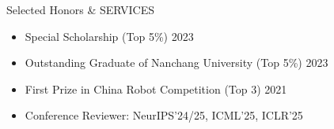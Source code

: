 \documentclass{resume} %
\begin{document}
\vspace{-0.5mm}
\begin{rSection}{Selected  Honors \& SERVICES}
\vspace{-1mm}
\begin{itemize}[leftmargin=1.5em]
    \item \small Special Scholarship (Top 5\%) \hfill 2023
    \item \small Outstanding Graduate of Nanchang University (Top 5\%) \hfill 2023
    \item \small First Prize in China Robot Competition (Top 3) \hfill 2021
    \item \small Conference Reviewer: NeurIPS'24/25, ICML'25, ICLR'25
\end{itemize}
\end{rSection}
\end{document}
